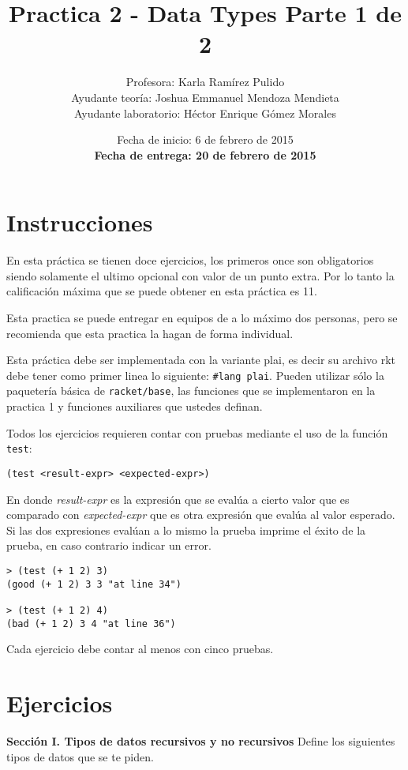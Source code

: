 \documentclass{article}
\author{Profesora: Karla Ramírez Pulido\\
  Ayudante teoría: Joshua Emmanuel Mendoza Mendieta\\
  Ayudante laboratorio: Héctor Enrique Gómez Morales}
\title{Practica 2 - Data Types Parte 1 de 2}
\date{Fecha de inicio: 6 de febrero de 2015\\
  \textbf{Fecha de entrega: 20 de febrero de 2015}}
\begin{document}
\maketitle
\section{Instrucciones}
En esta práctica se tienen doce ejercicios, los primeros once son
obligatorios siendo solamente el ultimo opcional con valor de un
punto extra. Por lo tanto la calificación máxima que se puede obtener en
esta práctica es 11.

Esta practica se puede entregar en equipos de a lo máximo dos
personas, pero se recomienda que esta practica la hagan de forma
individual.

Esta práctica debe ser implementada con la variante plai, es decir
su archivo rkt debe tener como primer linea lo siguiente:
\texttt{\#lang plai}. Pueden utilizar sólo la paquetería básica de
\texttt{racket/base}, las funciones que se implementaron en la
practica 1 y funciones auxiliares que ustedes definan.

Todos los ejercicios requieren contar con pruebas mediante el uso de
la función \texttt{test}:
\begin{verbatim}
(test <result-expr> <expected-expr>)
\end{verbatim}

En donde \textit{result-expr} es la expresión que se evalúa a cierto
valor que es comparado con \textit{expected-expr} que es otra
expresión que evalúa al valor esperado. Si las dos expresiones evalúan
a lo mismo la prueba imprime el éxito de la prueba, en caso contrario
indicar un error.

\begin{verbatim}
> (test (+ 1 2) 3)
(good (+ 1 2) 3 3 "at line 34")

> (test (+ 1 2) 4)
(bad (+ 1 2) 3 4 "at line 36")
\end{verbatim}

Cada ejercicio debe contar al menos con cinco pruebas.

\section{Ejercicios}
\textbf{Sección I. Tipos de datos recursivos y no recursivos} Define
los siguientes tipos de datos que se te piden.
\end{document}
